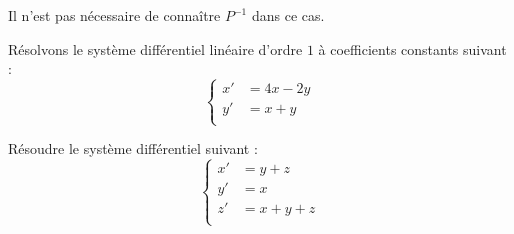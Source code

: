 \documentclass[french,11pt,twoside]{VcCours}
\begin{document}
\begin{Remarque}{} Il n'est pas nécessaire de connaître $P^{-1}$ dans ce cas.
\end{Remarque}

\begin{Exemple} Résolvons le système différentiel linéaire d'ordre $1$ à coefficients constants suivant : 
$$ \left\lbrace \begin{array}{lll}
    x' & = 4x - 2y \\
    y' & = x + y \\
    \end{array}\right.$$
    
    \vspace*{12cm}
\end{Exemple}

\newpage

\begin{ApplicationDirecte}{} Résoudre le système différentiel suivant :
$$ \left\lbrace \begin{array}{lll}
     x'&=y+z \\
    y' & =x \\
     z'&=x+y+z \\
    \end{array}\right.$$

\end{ApplicationDirecte}
\end{document}
